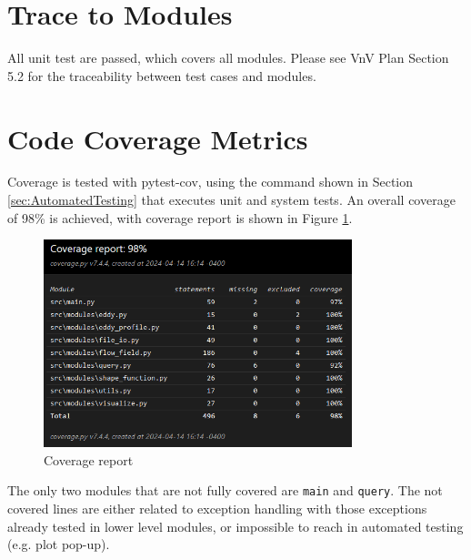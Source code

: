 \documentclass[12pt, titlepage]{article}
\begin{document}
\section{Trace to Modules}

All unit test are passed, which covers all modules. Please see VnV Plan Section 5.2 for the traceability between test cases and modules.

\section{Code Coverage Metrics}

Coverage is tested with pytest-cov, using the command shown in Section \ref{sec:AutomatedTesting} that executes unit and system tests. An overall coverage of 98\% is achieved, with coverage report is shown in Figure \ref{fig:coverage}. 

\begin{figure}[h!]
\begin{center}
  \includegraphics[width=0.8\textwidth]{img/coverage.png}
  \caption{Coverage report}
  \label{fig:coverage}
\end{center}
\end{figure}

The only two modules that are not fully covered are \texttt{main} and \texttt{query}. The not covered lines are either related to exception handling with those exceptions already tested in lower level modules, or impossible to reach in automated testing (e.g. plot pop-up).

% 
% 

\end{document}

